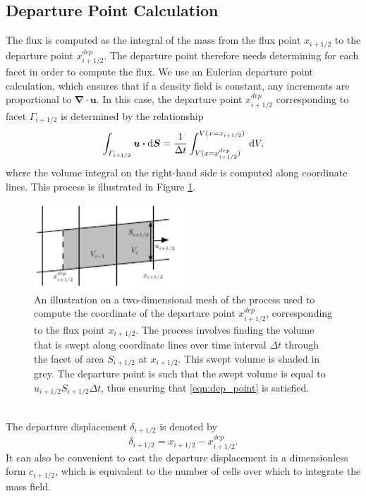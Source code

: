 \documentclass[11pt,a4paper]{article}
\newcommand{\dx}[1]{\hspace{0.75mm}\mathrm{d}{#1}}
\begin{document}
\subsection{Departure Point Calculation}
The flux is computed as the integral of the mass from the flux point $x_{i+1/2}$ to the departure point $x^{dep}_{i+1/2}$.
The departure point therefore needs determining for each facet in order to compute the flux.
We use an Eulerian departure point calculation, which ensures that if a density field is constant, any increments are proportional to $\bm{\nabla\cdot u}$.
In this case, the departure point $x^{dep}_{i+1/2}$ corresponding to facet $\varGamma_{i+1/2}$ is determined by the relationship
\begin{equation} \label{eqn:dep_point}
\int_{\varGamma_{i+1/2}} \bm{u \cdot} \mathrm{d}\bm{S} = \frac{1}{\Delta t} \int_{V(x=x^{dep}_{i+1/2})}^{V(x=x_{i+1/2})} \dx{V},
\end{equation}
where the volume integral on the right-hand side is computed along coordinate lines.
This process is illustrated in Figure \ref{fig:dep_point}. \\
\begin{figure}[h!]
\centering
\includegraphics[width=0.5\textwidth]{fig_1_dep_points.pdf}
\caption{An illustration on a two-dimensional mesh of the process used to compute the coordinate of the departure point $x^{dep}_{i+1/2}$, corresponding to the flux point $x_{i+1/2}$. The process involves finding the volume that is swept along coordinate lines over time interval $\Delta t$ through the facet of area $S_{i+1/2}$ at $x_{i+1/2}$.
This swept volume is shaded in grey.
The departure point is such that the swept volume is equal to $u_{i+1/2}S_{i+1/2}\Delta t$, thus ensuring that \eqref{eqn:dep_point} is satisfied.}
\label{fig:dep_point}
\end{figure} \\
The departure displacement $\delta_{i+1/2}$ is denoted by
\begin{equation}
\delta_{i+1/2} = x_{i+1/2} - x^{dep}_{i+1/2}.
\end{equation}
It can also be convenient to cast the departure displacement in a dimensionless form $c_{i+1/2}$, which is equivalent to the number of cells over which to integrate the mass field. \\
\end{document}
